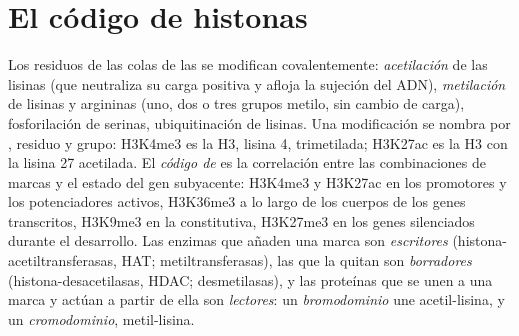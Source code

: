 \section{El código de histonas}

\begin{definition}\label{def:b3:chromatin-epigenetics:histone-code}
Los residuos de las colas de las  se modifican covalentemente:
\emph{acetilación} de las lisinas (que neutraliza su carga positiva y
afloja la sujeción del ADN), \emph{metilación} de lisinas y argininas
(uno, dos o tres grupos metilo, sin cambio de carga), fosforilación de
serinas, ubiquitinación de lisinas. Una modificación se nombra por
, residuo y grupo: H3K4me3 es la  H3, lisina 4,
trimetilada; H3K27ac es la H3 con la lisina 27 acetilada. El \emph{código
de } es la correlación entre las combinaciones de marcas y el
estado del gen subyacente: H3K4me3 y H3K27ac en los promotores y los
potenciadores activos, H3K36me3 a lo largo de los cuerpos de los genes
transcritos, H3K9me3 en la  constitutiva, H3K27me3 en los
genes silenciados durante el desarrollo. Las enzimas que añaden una marca
son \emph{escritores} (histona-acetiltransferasas, HAT;
metiltransferasas), las que la quitan son \emph{borradores}
(histona-desacetilasas, HDAC; desmetilasas), y las proteínas que se unen
a una marca y actúan a partir de ella son \emph{lectores}: un
\emph{bromodominio} une acetil-lisina, y un \emph{cromodominio},
metil-lisina.
\end{definition}

